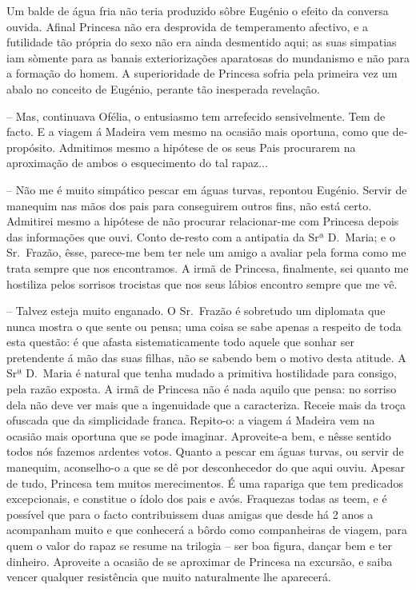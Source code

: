 \documentclass[9pt]{article}
\begin{document}
Um balde de água fria não teria produzido sôbre Eugé\-nio o efeito da
conversa ouvida. Afinal Princesa não era desprovida de temperamento afectivo, e a futilidade tão própria do sexo não era ainda desmentido aqui; as
suas simpatias iam sòmente para as banais exterioriza\-ções aparatosas do
mundanismo e não para a forma\-ção do homem. A supe\-rio\-ridade de Princesa sofria pela primeira vez um abalo no conceito de Eugé\-nio, perante tão inesperada revela\-ção.

-- Mas, continuava Ofélia, o entusiasmo tem arrefecido sensivelmen\-te. Tem
de facto. E a viagem á Madeira vem mesmo na ocasião mais oportuna, como que
de-propósito. Admitimos mesmo a hipótese de os seus Pais procurarem na
aproxima\-ção de ambos o esquecimento do tal rapaz...

-- Não me é muito simpático pescar em águas turvas, repontou Eugé\-nio.
Servir de manequim nas mãos dos pais para conseguirem outros fins, não está
certo. Admitirei mesmo a hipótese de não procurar relacionar-me com Princesa depois das informa\-ções que ouvi. Conto de-resto com a antipatia da
Srª D.\ Maria; e o Sr.\ Frazão, êsse, parece-me bem ter nele um amigo a avaliar
pela forma como me trata sempre que nos encontramos. A irmã de Princesa, finalmente, sei quanto me hostiliza pelos sorrisos trocistas que nos seus
lábios encontro sempre que me vê.

-- Talvez esteja muito enganado. O Sr.\ Frazão é sobretudo um diplomata
que nunca mostra o que sente ou pensa; uma coisa se sabe apenas a respeito
de toda esta questão: é que afasta sistematicamente todo aquele que sonhar
ser pretendente á mão das suas fi\-lhas, não se sabendo bem o motivo desta
atitude. A Srª D.\ Maria é natural que tenha mudado a primitiva hostilidade
para consigo, pela razão exposta. A irmã de Princesa não é nada aquilo que
pensa: no sorriso dela não deve ver mais que a ingenuidade que a ca\-ra\-cte\-ri\-za. Receie mais da troça ofuscada que da simplicidade franca. Repito-o:
a viagem á Madeira vem na ocasião mais oportuna que se pode imaginar. Aproveite-a bem, e nêsse sentido todos nós fazemos ardentes votos. Quanto a pescar em águas turvas, ou servir de manequim, aconse\-lho-o a que se dê por desconhecedor do que aqui ouviu. Apesar de tudo, Princesa tem muitos merecimentos. É uma rapariga que tem predicados excepcionais, e constitue o ídolo dos
pais e avós. Fraquezas todas as teem, e é possível que para o facto contribuissem duas amigas que desde há 2 anos a acompanham muito e que conhecerá
a bôrdo como companheiras de viagem, para quem o valor do rapaz se resume na
trilogia -- ser boa figura, dan\-çar bem e ter dinheiro. Aproveite a ocasião de
se a\-pro\-xi\-mar de Princesa na excursão, e saiba vencer qualquer resistência
que muito naturalmente lhe aparecerá.
\end{document}
